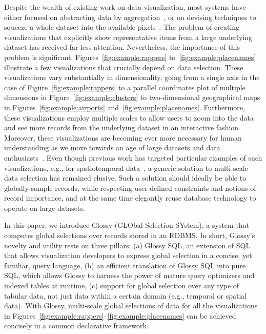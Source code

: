 \documentclass[11pt, oneside]{report}
\begin{document}
{Despite the wealth of existing work on data visualization, most systems have either focused on abstracting data by aggregation~\cite{blais:generating,LinsKS13:Nanocubes,StolteTH:2003:Multiscale,vartak:seedb}, or on devising techniques to squeeze a whole dataset into the available pixels~\cite{KeimK95:VisDB,KruskalW78:MDS}. The problem of creating visualizations that explicitly show representative items from a large underlying dataset has received far less attention. Nevertheless, the importance of this problem is significant. Figures~\ref{fig:example:rappers} to~\ref{fig:example:placenames} illustrate a few visualizations that crucially depend on data selection. These visualizations vary substantially in dimensionality, going from a single axis in the case of Figure~\ref{fig:example:rappers} to a parallel coordinates plot of multiple dimensions in Figure~\ref{fig:example:clusters} to two-dimensional geographical maps in Figures~\ref{fig:example:airports} and~\ref{fig:example:placenames}. Furthermore, these visualizations employ multiple scales to allow users to zoom into the data and see more records from the underlying dataset in an interactive fashion. Moreover, these visualizations are becoming ever more necessary for human understanding as we move towards an age of large datasets and data enthusiasts~\cite{hanrahan:enthusiast,markl:breaking}. Even though previous work has targeted particular examples of such visualizations, e.g., for spatiotemporal data~\cite{jugel:m4,KefaloukosSZ14:CVL,DasSarmaLGMH12:FusionTables}, a generic solution to multi-scale data selection has remained elusive. Such a solution should ideally be able to globally sample records, while respecting user-defined constraints and notions of record importance, and at the same time elegantly reuse database technology to operate on large datasets.   


In this paper, we introduce Glossy (GLObal Selection SYstem), a system that computes global selections over records stored in an RDBMS. In short, Glossy's novelty and utility rests on three pillars: (a) Glossy SQL, an extension of SQL that allows visualization developers to express global selection in a concise, yet familiar, query language, (b) an efficient translation of Glossy SQL into pure SQL, which allows Glossy to harness the power of mature query optimizers and indexed tables at runtime, (c) support for global selection over any type of tabular data, not just data within a certain domain (e.g., temporal or spatial data). With Glossy, multi-scale global selections of data for all the visualizations in Figures~\ref{fig:example:rappers}--\ref{fig:example:placenames} can be achieved concisely in a common declarative framework.  

}
\end{document}
